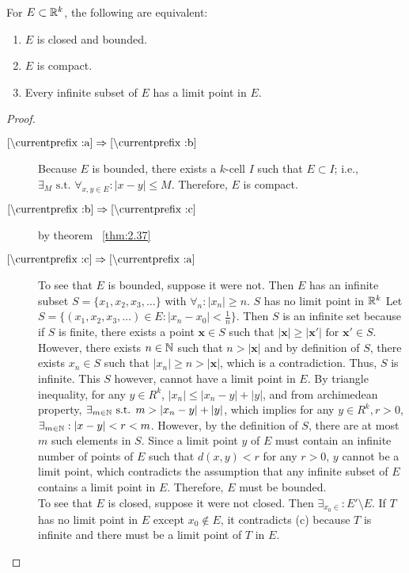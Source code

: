 \begin{theorem}
	\label{thm:2.41}
	\def\currentprefix{2.41}
	For $E \subset \mathbb{R}^{k}$, the following are equivalent:
	\begin{enumerate}[label=(\alph*)]
		\item $E$ is closed and bounded. 
		\item $E$ is compact. 
		\item Every infinite subset of $E$ has a limit point in $E$. 
	\end{enumerate}
	\begin{proof}
		\hfill
		\begin{description}
			\item[$\localref{a}\implies \localref{b}$] Because $E$ is bounded, there exists a $k$-cell $I$ such that $E \subset I$; i.e., $\exists_{M} \text{ s.t. } \forall_{x,y \in E}: |x-y|\le M$. Therefore, $E$ is compact.
			\item [$\localref{b}\implies \localref{c} $] by theorem ~\ref{thm:2.37}
			\item [$\localref{c} \implies \localref{a}$] To see that $E$ is bounded, suppose it were not. Then $E$ has an infinite subset $S=\{x_1,x_2,x_3,\ldots\}$ with $\forall_{n }: |x_n|\ge n$. $S$ has no limit point in $\mathbb{R} ^{k}$
			      Let $S=\{(x_1,x_2, x_3, \ldots) \in E: |x_n -x_0|<\frac{1}{n}\}$.
			      Then $S$ is an infinite set because if $S$ is finite, there exists a point $\mathbf{x} \in S$ such that $|\mathbf{x}|\ge |\mathbf{x'}| \text{ for } \mathbf{x'} \in S$.
			      However, there exists $n \in \mathbb{N}$ such that $n>|\mathbf{x}|$ and by definition of $S$, there exists $x_n \in S$ such that $|x_n|\ge n>|\mathbf{x}|$, which is a contradiction. Thus, $S$ is infinite.
			      This $S$ however, cannot have a limit point in $E$. By triangle inequality, for any $y \in R^k$, $|x_n|\le |x_n-y|+|y|$, and from archimedean property, $\exists_{m \in \mathbb{N}} \text{ s.t. } m > |x_n-y|+|y|$, which implies for any $y \in R^{k}, r>0$, $\exists_{m \in \mathbb{N}}: |x-y|<r<m$. However, by the definition of $S$, there are at most $m$ such elements in $S$. Since a limit point $y$ of $E$ must contain an infinite number of points of $E$ such that $d(x,y)<r$ for any $r>0$, $y$ cannot be a limit point, which contradicts the assumption that any infinite subset of $E$ contains a limit point in $E$. Therefore, $E$ must be bounded.\\
			      To see that $E$ is closed, suppose it were not closed.
			      Then $\exists_{x_0 \in }: E' \setminus E$.
			      If $T$ has no limit point in $E$ except $x_0 \not\in E$, it contradicts (c) because $T$ is infinite and there must be a limit point of $T$ in $E$.\\

\end{description}
\end{proof}
\end{theorem}
